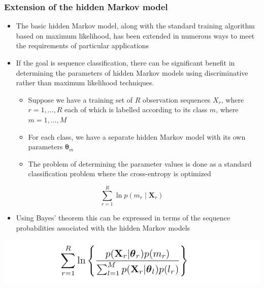 \documentclass[11pt]{article}
\begin{document}
\subsubsection{Extension of the hidden Markov model}
\label{sec:orgd99239f}
\begin{itemize}
\item The basic hidden Markov model, along with the standard training algorithm based on maximum likelihood, has been extended in numerous ways to meet the requirements of particular applications

\item If the goal is sequence classification, there can be significant benefit in determining the parameters of hidden Markov models using discriminative rather than maximum likelihood techniques.
\begin{itemize}
\item Suppose we have a training set of \(R\) observation sequences \(X_r\), where \(r=1,\dots, R\) each of which is labelled according to its class \(m\), where \(m=1,\dots, M\)
\item For each class, we have a separate hidden Markov model with its own parameters \(\pmb \theta_m\)
\item The problem of determining the parameter values is done as a standard classification problem where the cross-entropy is optimized
\end{itemize}
\end{itemize}
\begin{equation}
\sum_{r=1}^R \ln p(m_r \mid \pmb X_r)
\end{equation}
\begin{itemize}
\item Using Bayes’ theorem this can be expressed in terms of the sequence probabilities associated with the hidden Markov models
\end{itemize}
\begin{center}
\includegraphics[width=.9\linewidth]{Sequential Data/screenshot_2018-11-11_20-10-55.png}
\end{center}
\end{document}
